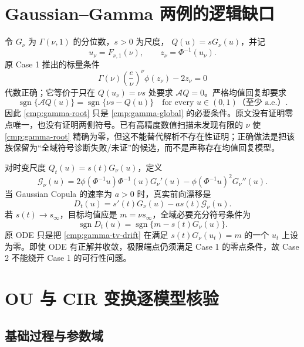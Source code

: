 \documentclass[UTF8,11pt]{ctexart}
\newcommand{\sgn}{\operatorname{sgn}}
\begin{document}
\section{Gaussian--Gamma 两例的逻辑缺口}

令 $G_\nu$ 为 $\Gamma(\nu,1)$ 的分位数，$s>0$ 为尺度，
$Q(u)=sG_\nu(u)$，并记
\[
u_\nu=F_{\nu,1}(\nu),\qquad z_\nu=\Phi^{-1}(u_\nu).
\]
原 Case 1 推出的标量条件
\begin{equation}
\Gamma(\nu)\left(\frac e\nu\right)^\nu\phi(z_\nu)-2z_\nu=0
\label{cmp:gamma-root}
\end{equation}
代数正确；它等价于只在 $Q(u_\nu)=\nu s$ 处要求 $\mathcal A Q=0$。严格均值回复却要求
\begin{equation}
\sgn\{\mathcal A Q(u)\}=\sgn\{\nu s-Q(u)\}
\quad\text{for every }u\in(0,1)\text{（至少 a.e.）}.\label{cmp:gamma-global}
\end{equation}
因此 \eqref{cmp:gamma-root} 只是 \eqref{cmp:gamma-global} 的必要条件。原文没有证明零点唯一，也没有证明两侧符号。已有高精度数值扫描未发现有限的 $\nu$ 使 \eqref{cmp:gamma-root} 精确为零，但这不能替代解析不存在性证明；正确做法是把该族保留为“全域符号诊断失败/未证”的候选，而不是声称存在均值回复模型。

对时变尺度 $Q_t(u)=s(t)G_\nu(u)$，定义
\[
\mathscr G_\nu(u)=2\phi(\Phi^{-1}u)\Phi^{-1}(u)G_\nu'(u)
-\phi(\Phi^{-1}u)^2G_\nu''(u).
\]
当 Gaussian Copula 的速率为 $a>0$ 时，真实前向漂移是
\begin{equation}
D_t(u)=s'(t)G_\nu(u)-a s(t)\mathscr G_\nu(u).\label{cmp:gamma-tv-drift}
\end{equation}
若 $s(t)\to s_\infty$，目标均值应是 $m=\nu s_\infty$，全域必要充分符号条件为
\begin{equation}
\sgn D_t(u)=\sgn\{m-s(t)G_\nu(u)\}.\label{cmp:gamma-tv-global}
\end{equation}
原 ODE 只是把 \eqref{cmp:gamma-tv-drift} 在满足 $s(t)G_\nu(u_t)=m$ 的一个 $u_t$ 上设为零。即使 ODE 有正解并收敛，极限端点仍须满足 Case 1 的零点条件，故 Case 2 不能绕开 Case 1 的可行性问题。

\section{OU 与 CIR 变换逐模型核验}

\subsection{基础过程与参数域}
\end{document}
